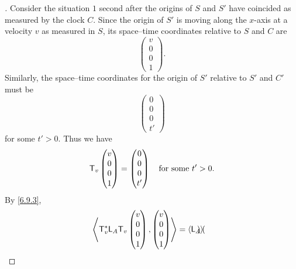 \begin{proof}[]
  Consider the situation \(1\) second after the origins of \(S\) and \(S'\) have coincided as measured by the clock \(C\).
  Since the origin of \(S'\) is moving along the \(x\)-axis at a velocity \(v\) as measured in \(S\), its space--time coordinates relative to \(S\) and \(C\) are
  \[
    \begin{pmatrix}
      v \\
      0 \\
      0 \\
      1
    \end{pmatrix}.
  \]
  Similarly, the space--time coordinates for the origin of \(S'\) relative to \(S'\) and \(C'\) must be
  \[
    \begin{pmatrix}
      0 \\
      0 \\
      0 \\
      t'
    \end{pmatrix}
  \]
  for some \(t' > 0\).
  Thus we have
  \[
    \mathsf{T}_v\begin{pmatrix}
      v \\
      0 \\
      0 \\
      1
    \end{pmatrix} = \begin{pmatrix}
      0 \\
      0 \\
      0 \\
      t'
    \end{pmatrix} \quad \text{for some } t' > 0.
  \]
  By \cref{6.9.3},
  \begin{align*}
    \left\langle\mathsf{T}_v^* \mathsf{L}_A \mathsf{T}_v\begin{pmatrix}
                             v \\
                             0 \\
                             0 \\
                             1
                           \end{pmatrix}, \begin{pmatrix}
                                            v \\
                                            0 \\
                                            0 \\
                                            1
                                          \end{pmatrix}\right\rangle & = \left\langle\mathsf{L}_A\begin{pmatrix}

\end{pmatrix}\right\rangle
\end{align*}
\end{proof}
